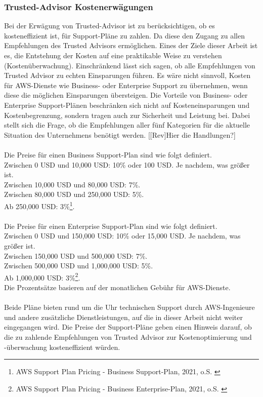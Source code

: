 \subsubsection*{Trusted-Advisor Kostenerwägungen}
Bei der Erwägung von Trusted-Advisor ist zu berücksichtigen, ob es kosteneffizient ist, für Support-Pläne zu zahlen. Da diese den Zugang zu allen Empfehlungen des Trusted Advisors ermöglichen. Eines der Ziele dieser Arbeit ist es, die Entstehung der Kosten auf eine praktikable Weise zu verstehen (Kostenüberwachung). Einschränkend lässt sich sagen, ob alle Empfehlungen von Trusted Advisor zu echten Einsparungen führen. %
Es wäre nicht sinnvoll, Kosten für AWS-Dienste wie Business- oder Enterprise Support zu übernehmen, wenn diese die möglichen Einsparungen übersteigen. Die Vorteile von Business- oder Enterprise Support-Plänen beschränken sich nicht auf Kosteneinsparungen und Kostenbegrenzung, sondern tragen auch zur Sicherheit und Leistung bei. Dabei stellt sich die Frage, ob die Empfehlungen aller fünf Kategorien für die aktuelle Situation des Unternehmens benötigt werden.
[[Rev]Hier die Handlungen?]
\\\\   
Die Preise für einen Business Support-Plan sind wie folgt definiert. 
\\
Zwischen 0 USD und 10,000 USD: 10\% oder 100 USD. Je nachdem, was größer ist.\\
Zwischen 10,000 USD und 80,000 USD: 7\%.\\
Zwischen 80,000 USD und 250,000 USD: 5\%.\\
Ab 250,000 USD: 3\%\footnote{ AWS Support Plan Pricing - Business Support-Plan, 2021, o.S. \cite{AMZ38}}.
\\\\
Die Preise für einen Enterprise Support-Plan sind wie folgt definiert.
\\
Zwischen 0 USD und 150,000 USD: 10\% oder 15,000 USD. Je nachdem, was größer ist.\\
Zwischen 150,000 USD und 500,000 USD: 7\%.\\
Zwischen 500,000 USD und 1,000,000 USD: 5\%.\\
Ab 1,000,000 USD: 3\%\footnote{ AWS Support Plan Pricing - Business Enterprise-Plan, 2021, o.S. \cite{AMZ38}}.\\
Die Prozentsätze basieren auf der monatlichen Gebühr für AWS-Dienste.
\\\\
Beide Pläne bieten rund um die Uhr technischen Support durch AWS-Ingenieure und andere zusätzliche Dienstleistungen, auf die in dieser Arbeit nicht weiter eingegangen wird. Die Preise der Support-Pläne geben einen Hinweis darauf, ob die zu zahlende Empfehlungen von Trusted Advisor zur Kostenoptimierung und -überwachung kosteneffizient würden.

